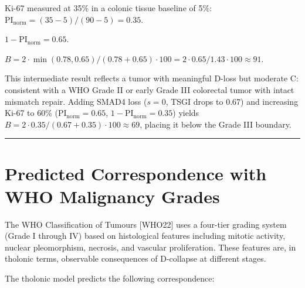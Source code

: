 \documentclass[12pt]{article}
\begin{document}
Ki-67 measured at 35\% in a colonic tissue baseline of 5\%:
\(\text{PI}_\text{norm} = (35-5)/(90-5) = 0.35\).

\(1 - \text{PI}_\text{norm} = 0.65\).

\(B = 2 \cdot \min(0.78, 0.65) / (0.78 + 0.65) \cdot 100 = 2 \cdot 0.65 / 1.43 \cdot 100 \approx 91\).

This intermediate result reflects a tumor with meaningful D-loss but
moderate C: consistent with a WHO Grade II or early Grade III colorectal
tumor with intact mismatch repair. Adding SMAD4 loss (\(s = 0\), TSGI
drops to 0.67) and increasing Ki-67 to 60\%
(\(\text{PI}_\text{norm} = 0.65\), \(1 - \text{PI}_\text{norm} = 0.35\))
yields \(B = 2 \cdot 0.35 / (0.67 + 0.35) \cdot 100 \approx 69\),
placing it below the Grade III boundary.

\begin{center}\rule{0.5\linewidth}{0.5pt}\end{center}

\section{Predicted Correspondence with WHO Malignancy Grades}\label{predicted-correspondence-with-who-malignancy-grades}

The WHO Classification of Tumours {[}WHO22{]} uses a four-tier grading
system (Grade I through IV) based on histological features including
mitotic activity, nuclear pleomorphism, necrosis, and vascular
proliferation. These features are, in tholonic terms, observable
consequences of D-collapse at different stages.

The tholonic model predicts the following correspondence:
\end{document}
